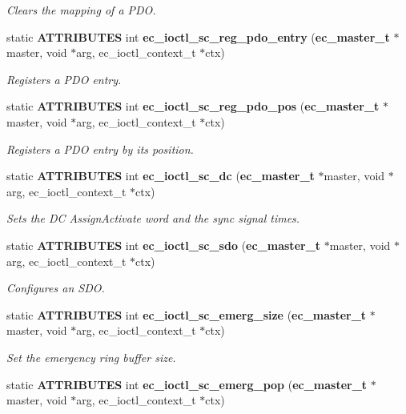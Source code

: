 \begin{DoxyCompactItemize}
\begin{DoxyCompactList}\small\item\em Clears the mapping of a P\-D\-O. \end{DoxyCompactList}\item 
static {\bf A\-T\-T\-R\-I\-B\-U\-T\-E\-S} int {\bf ec\-\_\-ioctl\-\_\-sc\-\_\-reg\-\_\-pdo\-\_\-entry} ({\bf ec\-\_\-master\-\_\-t} $\ast$master, void $\ast$arg, ec\-\_\-ioctl\-\_\-context\-\_\-t $\ast$ctx)
\begin{DoxyCompactList}\small\item\em Registers a P\-D\-O entry. \end{DoxyCompactList}\item 
static {\bf A\-T\-T\-R\-I\-B\-U\-T\-E\-S} int {\bf ec\-\_\-ioctl\-\_\-sc\-\_\-reg\-\_\-pdo\-\_\-pos} ({\bf ec\-\_\-master\-\_\-t} $\ast$master, void $\ast$arg, ec\-\_\-ioctl\-\_\-context\-\_\-t $\ast$ctx)
\begin{DoxyCompactList}\small\item\em Registers a P\-D\-O entry by its position. \end{DoxyCompactList}\item 
static {\bf A\-T\-T\-R\-I\-B\-U\-T\-E\-S} int {\bf ec\-\_\-ioctl\-\_\-sc\-\_\-dc} ({\bf ec\-\_\-master\-\_\-t} $\ast$master, void $\ast$arg, ec\-\_\-ioctl\-\_\-context\-\_\-t $\ast$ctx)
\begin{DoxyCompactList}\small\item\em Sets the D\-C Assign\-Activate word and the sync signal times. \end{DoxyCompactList}\item 
static {\bf A\-T\-T\-R\-I\-B\-U\-T\-E\-S} int {\bf ec\-\_\-ioctl\-\_\-sc\-\_\-sdo} ({\bf ec\-\_\-master\-\_\-t} $\ast$master, void $\ast$arg, ec\-\_\-ioctl\-\_\-context\-\_\-t $\ast$ctx)
\begin{DoxyCompactList}\small\item\em Configures an S\-D\-O. \end{DoxyCompactList}\item 
static {\bf A\-T\-T\-R\-I\-B\-U\-T\-E\-S} int {\bf ec\-\_\-ioctl\-\_\-sc\-\_\-emerg\-\_\-size} ({\bf ec\-\_\-master\-\_\-t} $\ast$master, void $\ast$arg, ec\-\_\-ioctl\-\_\-context\-\_\-t $\ast$ctx)
\begin{DoxyCompactList}\small\item\em Set the emergency ring buffer size. \end{DoxyCompactList}\item 
static {\bf A\-T\-T\-R\-I\-B\-U\-T\-E\-S} int {\bf ec\-\_\-ioctl\-\_\-sc\-\_\-emerg\-\_\-pop} ({\bf ec\-\_\-master\-\_\-t} $\ast$master, void $\ast$arg, ec\-\_\-ioctl\-\_\-context\-\_\-t $\ast$ctx)

\end{DoxyCompactItemize}
